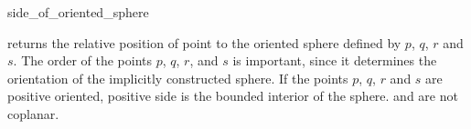 \begin{ccRefFunction}{side_of_oriented_sphere}

         {returns the relative position of point 
          to the oriented sphere defined by $p$, $q$, $r$ and $s$.
          The order of the points $p$, $q$, $r$, and $s$ is important,
          since it determines the orientation of the implicitly
          constructed sphere. If the points $p$, $q$, $r$ and $s$
          are positive oriented, positive side is the bounded interior
          of the sphere.
          \ccPrecond {} and  are not coplanar.}
\end{ccRefFunction}

